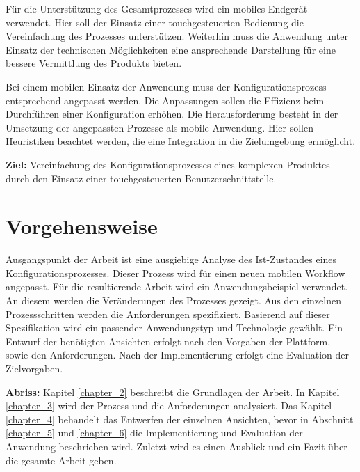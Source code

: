 Für die Unterstützung des Gesamtprozesses wird ein mobiles Endgerät verwendet. Hier soll der Einsatz einer touchgesteuerten Bedienung die Vereinfachung des Prozesses unterstützen. Weiterhin muss die Anwendung unter Einsatz der technischen Möglichkeiten eine ansprechende Darstellung für eine bessere Vermittlung des Produkts bieten. 

Bei einem mobilen Einsatz der Anwendung muss der Konfigurationsprozess entsprechend angepasst werden. Die Anpassungen sollen die Effizienz beim Durchführen einer Konfiguration erhöhen. Die Herausforderung besteht in der Umsetzung der angepassten Prozesse als mobile Anwendung. Hier sollen Heuristiken beachtet werden, die eine Integration in die Zielumgebung ermöglicht. 



\begin{mdframed}[backgroundcolor=gray!40,shadow=true,roundcorner=8pt]
\textbf{Ziel:} \newline
Vereinfachung des Konfigurationsprozesses eines komplexen Produktes durch den Einsatz einer touchgesteuerten Benutzerschnittstelle.
\end{mdframed}

\section{Vorgehensweise}
Ausgangspunkt der Arbeit ist eine ausgiebige Analyse des Ist-Zustandes eines Konfigurationsprozesses. Dieser Prozess wird für einen neuen mobilen Workflow angepasst. Für die resultierende Arbeit wird ein Anwendungsbeispiel verwendet. An diesem werden die Veränderungen des Prozesses gezeigt. Aus den einzelnen Prozessschritten werden die Anforderungen spezifiziert. Basierend auf dieser Spezifikation wird ein passender Anwendungstyp und Technologie gewählt. Ein Entwurf der benötigten Ansichten erfolgt nach den Vorgaben der Plattform, sowie den Anforderungen. Nach der Implementierung erfolgt eine Evaluation der Zielvorgaben. 
\par
\textbf{Abriss: }
Kapitel \ref{chapter_2} beschreibt die Grundlagen der Arbeit. In Kapitel \ref{chapter_3} wird der Prozess und die Anforderungen analysiert. Das Kapitel \ref{chapter_4} behandelt das Entwerfen der einzelnen Ansichten, bevor in Abschnitt \ref{chapter_5} und \ref{chapter_6} die Implementierung und Evaluation der Anwendung beschrieben wird. Zuletzt wird es einen Ausblick und ein Fazit über die gesamte Arbeit geben.







